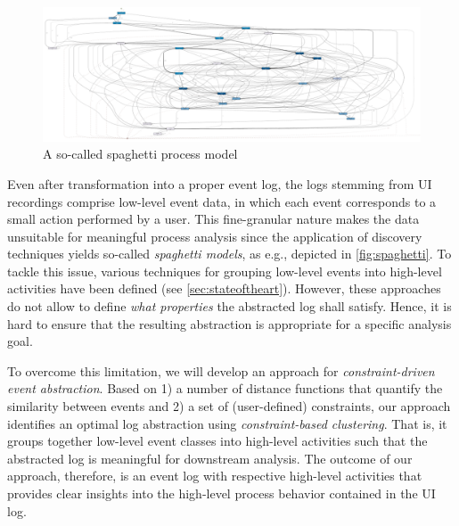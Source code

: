 \begin{figure} 
	\vspace{-25pt}
	\begin{center}
		\includegraphics[width=\linewidth]{./figures/spaghettiprocess.png}
		\caption{A so-called spaghetti process model}
		\label{fig:spaghetti}
	\end{center}
	\vspace{-15pt}
	\vspace{1pt}
\end{figure} 
Even after transformation into a proper event log, the logs stemming from UI recordings comprise low-level event data, in which each event corresponds to a small action performed by a user. This fine-granular nature makes the data unsuitable for meaningful process analysis since the application of discovery techniques yields so-called \emph{spaghetti models}, as e.g., depicted in \autoref{fig:spaghetti}. To tackle this issue, various techniques for grouping low-level events into high-level activities have been defined (see \autoref{sec:stateoftheart}). However, these approaches do not allow to define \emph{what properties} the abstracted log shall satisfy. Hence, it is hard to ensure that the resulting abstraction is appropriate for a specific analysis goal. 


To overcome this limitation, we will develop an approach for \emph{constraint-driven event abstraction}. Based on 1) a number of distance functions that quantify the similarity between events and 2) a set of (user-defined) constraints, our approach identifies an optimal log abstraction using \textit{constraint-based clustering}. That is, it groups together low-level event classes into high-level activities such that the abstracted log is meaningful for downstream analysis. The outcome of our approach, therefore, is an event log with respective high-level activities that provides clear insights into the high-level process behavior contained in the UI log.

